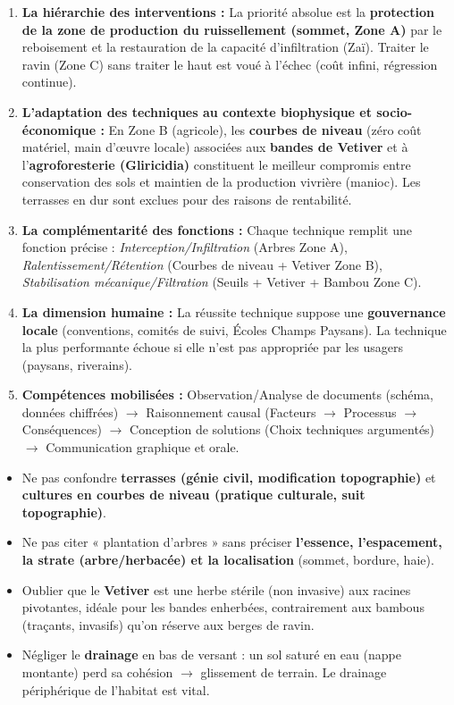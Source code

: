 \documentclass[11pt]{article}
\begin{document}
\begin{enumerate}
    \item \textbf{La hiérarchie des interventions :} La priorité absolue est la \textbf{protection de la zone de production du ruissellement (sommet, Zone A)} par le reboisement et la restauration de la capacité d'infiltration (Zaï). Traiter le ravin (Zone C) sans traiter le haut est voué à l'échec (coût infini, régression continue).
    \item \textbf{L'adaptation des techniques au contexte biophysique et socio-économique :} En Zone B (agricole), les \textbf{courbes de niveau} (zéro coût matériel, main d'œuvre locale) associées aux \textbf{bandes de Vetiver} et à l'\textbf{agroforesterie (Gliricidia)} constituent le meilleur compromis entre conservation des sols et maintien de la production vivrière (manioc). Les terrasses en dur sont exclues pour des raisons de rentabilité.
    \item \textbf{La complémentarité des fonctions :} Chaque technique remplit une fonction précise : \emph{Interception/Infiltration} (Arbres Zone A), \emph{Ralentissement/Rétention} (Courbes de niveau + Vetiver Zone B), \emph{Stabilisation mécanique/Filtration} (Seuils + Vetiver + Bambou Zone C).
    \item \textbf{La dimension humaine :} La réussite technique suppose une \textbf{gouvernance locale} (conventions, comités de suivi, Écoles Champs Paysans). La technique la plus performante échoue si elle n'est pas appropriée par les usagers (paysans, riverains).
    \item \textbf{Compétences mobilisées :} Observation/Analyse de documents (schéma, données chiffrées) $\rightarrow$ Raisonnement causal (Facteurs $\rightarrow$ Processus $\rightarrow$ Conséquences) $\rightarrow$ Conception de solutions (Choix techniques argumentés) $\rightarrow$ Communication graphique et orale.
\end{enumerate}

\begin{attention}
\begin{itemize}
    \item Ne pas confondre \textbf{terrasses (génie civil, modification topographie)} et \textbf{cultures en courbes de niveau (pratique culturale, suit topographie)}.
    \item Ne pas citer « plantation d'arbres » sans préciser \textbf{l'essence, l'espacement, la strate (arbre/herbacée) et la localisation} (sommet, bordure, haie).
    \item Oublier que le \textbf{Vetiver} est une herbe stérile (non invasive) aux racines pivotantes, idéale pour les bandes enherbées, contrairement aux bambous (traçants, invasifs) qu'on réserve aux berges de ravin.
    \item Négliger le \textbf{drainage} en bas de versant : un sol saturé en eau (nappe montante) perd sa cohésion $\rightarrow$ glissement de terrain. Le drainage périphérique de l'habitat est vital.
\end{itemize}
\end{attention}
\end{document}
